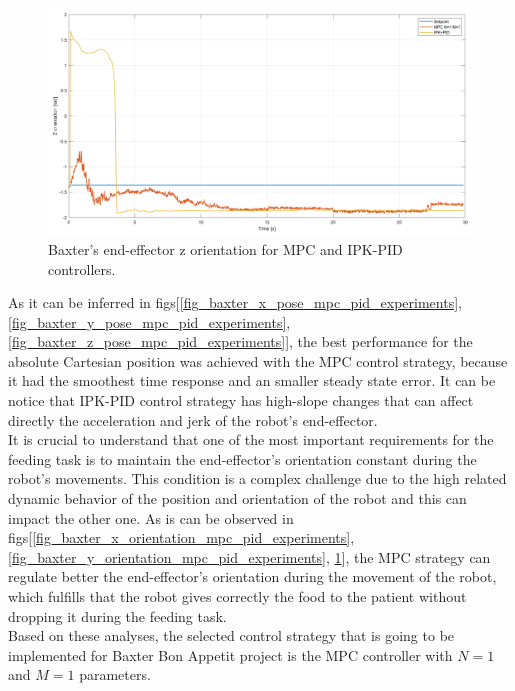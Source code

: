 \documentclass[11pt]{report} %
\begin{document}
\begin{figure}[H]
    \centering
    \includegraphics[width=1.0\linewidth]{assets/imgs/control_theory/mpc_vs_pid/z_orientation.png}
    \caption{Baxter's end-effector z orientation for MPC and IPK-PID controllers.} 
    \label{fig_baxter_z_orientation_mpc_pid_experiments}
\end{figure}

As it can be inferred in figs[\ref{fig_baxter_x_pose_mpc_pid_experiments}, \ref{fig_baxter_y_pose_mpc_pid_experiments}, \ref{fig_baxter_z_pose_mpc_pid_experiments}], the best performance for the absolute Cartesian position was achieved with the MPC control strategy, because it had the smoothest time response and an smaller steady state error. It can be notice that IPK-PID control strategy has high-slope changes that can affect directly the acceleration and jerk of the robot's end-effector. \\

It is crucial to understand that one of the most important requirements for the feeding task is to maintain the end-effector's orientation constant during the robot's movements. This condition is a complex challenge due to the high related dynamic behavior of the position and orientation of the robot and this can impact the other one. As is can be observed in figs[\ref{fig_baxter_x_orientation_mpc_pid_experiments}, \ref{fig_baxter_y_orientation_mpc_pid_experiments}, \ref{fig_baxter_z_orientation_mpc_pid_experiments}], the MPC strategy can regulate better the end-effector's orientation during the movement of the robot, which fulfills that the robot gives correctly the food to the patient without dropping it during the feeding task. \\

Based on these analyses, the selected control strategy that is going to be implemented for Baxter Bon Appetit project is the MPC controller with $N=1$ and $M=1$ parameters. \\
\end{document}
